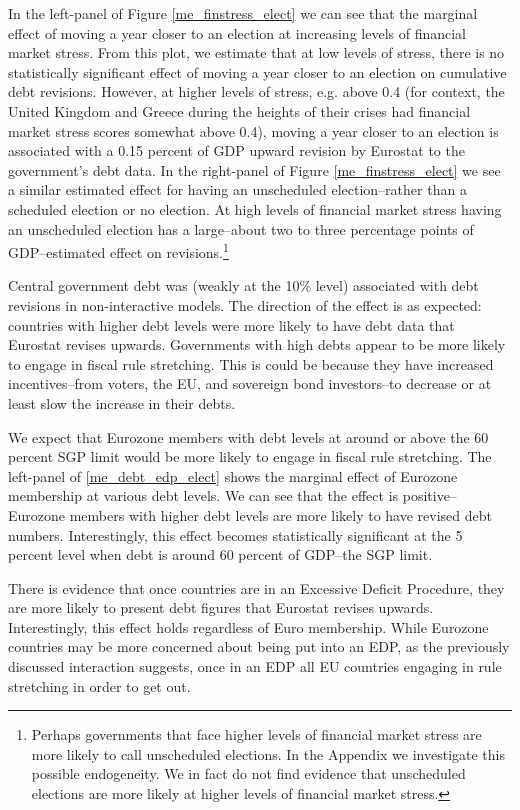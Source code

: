 \documentclass[]{article}
\begin{document}
In the left-panel of Figure \ref{me_finstress_elect} we can see that the marginal effect of moving a year closer to an election at increasing levels of financial market stress. From this plot, we estimate that at low levels of stress, there is no statistically significant effect of moving a year closer to an election on cumulative debt revisions. However, at higher levels of stress, e.g. above 0.4 (for context, the United Kingdom and Greece during the heights of their crises had financial market stress scores somewhat above 0.4), moving a year closer to an election is associated with a 0.15 percent of GDP upward revision by Eurostat to the government's debt data. In the right-panel of Figure \ref{me_finstress_elect} we see a similar estimated effect for having an unscheduled election--rather than a scheduled election or no election. At high levels of financial market stress having an unscheduled election has a large--about two to three percentage points of GDP--estimated effect on revisions.\footnote{Perhaps governments that face higher levels of financial market stress are more likely to call unscheduled elections. In the Appendix we investigate this possible endogeneity. We in fact do not find evidence that unscheduled elections are more likely at higher levels of financial market stress.}

Central government debt was (weakly at the 10\% level) associated with debt revisions in non-interactive models. The direction of the effect is as expected: countries with higher debt levels were more likely to have debt data that Eurostat revises upwards. Governments with high debts appear to be more likely to engage in fiscal rule stretching. This is could be because they have increased incentives--from voters, the EU, and sovereign bond investors--to decrease or at least slow the increase in their debts.

We expect that Eurozone members with debt levels at around or above the 60 percent SGP limit would be more likely to engage in fiscal rule stretching. The left-panel of \ref{me_debt_edp_elect} shows the marginal effect of Eurozone membership at various debt levels. We can see that the effect is positive--Eurozone members with higher debt levels are more likely to have revised debt numbers. Interestingly, this effect becomes statistically significant at the 5 percent level when debt is around 60 percent of GDP--the SGP limit.

There is evidence that once countries are in an Excessive Deficit Procedure, they are more likely to present debt figures that Eurostat revises upwards. Interestingly, this effect holds regardless of Euro membership. While Eurozone countries may be more concerned about being put into an EDP, as the previously discussed interaction suggests, once in an EDP all EU countries engaging in rule stretching in order to get out.
\end{document}
